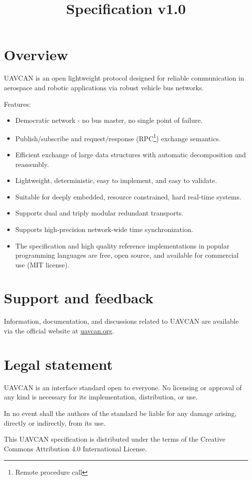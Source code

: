 \documentclass{uavcandoc}
\title{Specification v1.0}
\begin{document}
\frontmatter

\begin{titlepage}

\section*{Overview}

UAVCAN is an open lightweight protocol designed for reliable communication in aerospace and robotic applications via
robust vehicle bus networks.

Features:

\begin{itemize}
    \item Democratic network - no bus master, no single point of failure.
    \item Publish/subscribe and request/response (RPC\footnote{Remote procedure call}) exchange semantics.
    \item Efficient exchange of large data structures with automatic decomposition and reassembly.
    \item Lightweight, deterministic, easy to implement, and easy to validate.
    \item Suitable for deeply embedded, resource constrained, hard real-time systems.
    \item Supports dual and triply modular redundant transports.
    \item Supports high-precision network-wide time synchronization.
    \item The specification and high quality reference implementations in popular programming languages are free,
    open source, and available for commercial use (MIT license).
\end{itemize}

\BeginRightColumn

\section*{Support and feedback}

Information, documentation, and discussions related to UAVCAN are available via the official website at
\href{http://uavcan.org}{uavcan.org}.

\section*{Legal statement}

UAVCAN is an interface standard open to everyone.
No licensing or approval of any kind is necessary for its implementation, distribution, or use.

In no event shall the authors of the standard be liable for any damage arising, directly or indirectly, from its use.

This UAVCAN specification is distributed under the terms of the Creative Commons Attribution 4.0 International License.

\end{titlepage}
\end{document}
